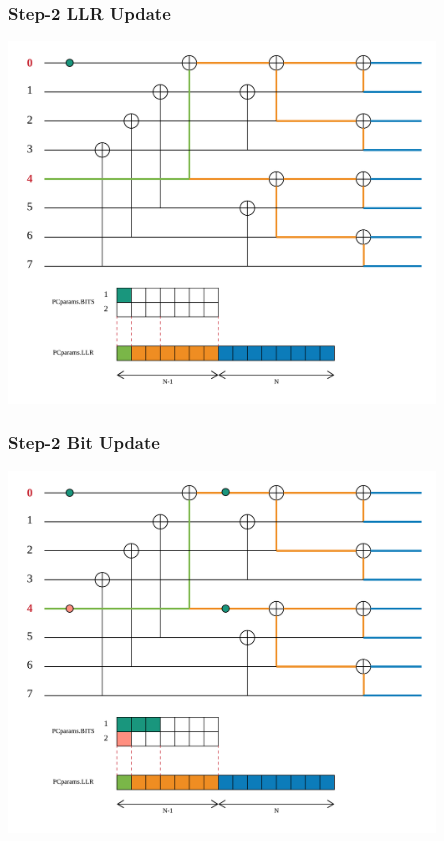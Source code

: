 \documentclass{beamer}
\begin{document}
\begin{frame}
\frametitle{Step-2 LLR Update}
  \begin{center}
  \includegraphics[width=0.85\textwidth]{pics/polar_-_SC_llr_2.png}
  \end{center}
\end{frame}

\begin{frame}
\frametitle{Step-2 Bit Update}
  \begin{center}
  \includegraphics[width=0.85\textwidth]{pics/polar_-_SC_bit_2.png}
  \end{center}
\end{frame}
\end{document}
